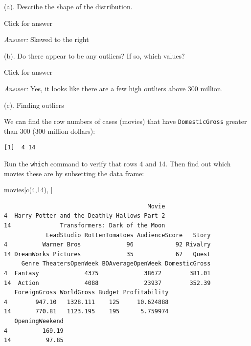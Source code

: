 \documentclass[
]{book}
\newenvironment{Shaded}{\begin{snugshade}}{\end{snugshade}}
\newcommand{\DecValTok}[1]{\textcolor[rgb]{0.00,0.00,0.81}{#1}}
\newcommand{\FunctionTok}[1]{\textcolor[rgb]{0.00,0.00,0.00}{#1}}
\newcommand{\NormalTok}[1]{#1}
\newcommand{\SpecialCharTok}[1]{\textcolor[rgb]{0.00,0.00,0.00}{#1}}
\begin{document}
(a). Describe the shape of the distribution.

Click for answer

\emph{Answer:} Skewed to the right

(b). Do there appear to be any outliers? If so, which values?

Click for answer

\emph{Answer:} Yes, it looks like there are a few high outliers above 300 million.

(c). Finding outliers

We can find the row numbers of cases (movies) that have \texttt{DomesticGross} greater than 300 (300 million dollars):

\begin{Shaded}
\end{Shaded}

\begin{verbatim}
[1]  4 14
\end{verbatim}

Run the \texttt{which} command to verify that rows 4 and 14. Then find out which movies these are by subsetting the data frame:

\begin{Shaded}
\begin{Highlighting}[]
\NormalTok{movies[}\FunctionTok{c}\NormalTok{(}\DecValTok{4}\NormalTok{,}\DecValTok{14}\NormalTok{), ]}
\end{Highlighting}
\end{Shaded}

\begin{verbatim}
                                         Movie
4  Harry Potter and the Deathly Hallows Part 2
14              Transformers: Dark of the Moon
            LeadStudio RottenTomatoes AudienceScore   Story
4          Warner Bros             96            92 Rivalry
14 DreamWorks Pictures             35            67   Quest
     Genre TheatersOpenWeek BOAverageOpenWeek DomesticGross
4  Fantasy             4375             38672        381.01
14  Action             4088             23937        352.39
   ForeignGross WorldGross Budget Profitability
4        947.10   1328.111    125     10.624888
14       770.81   1123.195    195      5.759974
   OpeningWeekend
4          169.19
14          97.85
\end{verbatim}
\end{document}
